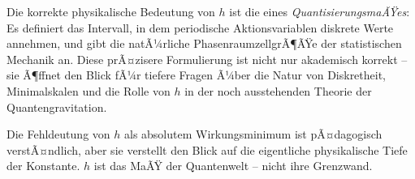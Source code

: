 ﻿\documentclass[12pt,a4paper]{article}
\theoremstyle{plain}
\theoremstyle{definition}
\theoremstyle{remark}
\begin{document}
Die korrekte physikalische Bedeutung von $h$ ist die eines \emph{QuantisierungsmaÃŸes}:
Es definiert das Intervall, in dem periodische Aktionsvariablen diskrete Werte annehmen,
und gibt die natÃ¼rliche PhasenraumzellgrÃ¶ÃŸe der statistischen Mechanik an. Diese
prÃ¤zisere Formulierung ist nicht nur akademisch korrekt -- sie Ã¶ffnet den Blick fÃ¼r
tiefere Fragen Ã¼ber die Natur von Diskretheit, Minimalskalen und die Rolle von $h$ in
der noch ausstehenden Theorie der Quantengravitation.

Die Fehldeutung von $h$ als absolutem Wirkungsminimum ist pÃ¤dagogisch verstÃ¤ndlich,
aber sie verstellt den Blick auf die eigentliche physikalische Tiefe der Konstante.
$h$ ist das MaÃŸ der Quantenwelt -- nicht ihre Grenzwand.


\end{document}
